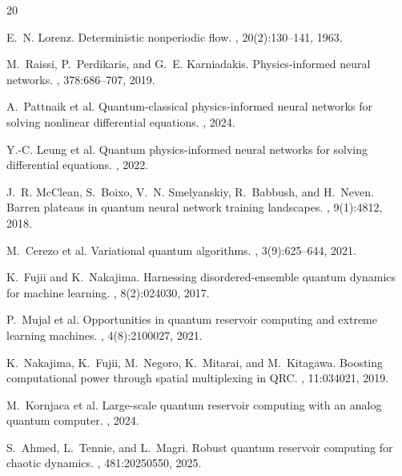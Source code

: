 \documentclass[11pt,a4paper]{article}
\begin{document}

\begin{thebibliography}{20}

E.~N. Lorenz.
\newblock Deterministic nonperiodic flow.
, 20(2):130--141, 1963.

M.~Raissi, P.~Perdikaris, and G.~E. Karniadakis.
\newblock Physics-informed neural networks.
, 378:686--707, 2019.

A.~Pattnaik et al.
\newblock Quantum-classical physics-informed neural networks for solving nonlinear differential equations.
, 2024.

Y.-C. Leung et al.
\newblock Quantum physics-informed neural networks for solving differential equations.
, 2022.

J.~R. McClean, S.~Boixo, V.~N. Smelyanskiy, R.~Babbush, and H.~Neven.
\newblock Barren plateaus in quantum neural network training landscapes.
, 9(1):4812, 2018.

M.~Cerezo et al.
\newblock Variational quantum algorithms.
, 3(9):625--644, 2021.

K.~Fujii and K.~Nakajima.
\newblock Harnessing disordered-ensemble quantum dynamics for machine learning.
, 8(2):024030, 2017.

P.~Mujal et al.
\newblock Opportunities in quantum reservoir computing and extreme learning machines.
, 4(8):2100027, 2021.

K.~Nakajima, K.~Fujii, M.~Negoro, K.~Mitarai, and M.~Kitagawa.
\newblock Boosting computational power through spatial multiplexing in QRC.
, 11:034021, 2019.

M.~Kornjaca et al.
\newblock Large-scale quantum reservoir computing with an analog quantum computer.
, 2024.

S.~Ahmed, L.~Tennie, and L.~Magri.
\newblock Robust quantum reservoir computing for chaotic dynamics.
, 481:20250550, 2025.


\end{thebibliography}
\end{document}
